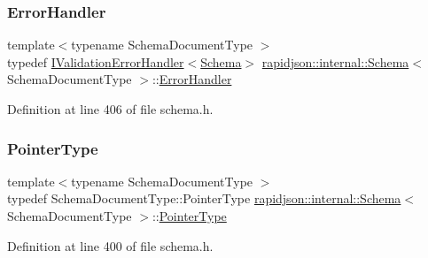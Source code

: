 \mbox{\label{classrapidjson_1_1internal_1_1_schema_ab10ebd341d1058236e9aac64cf2cb1eb}} 
\subsubsection{\texorpdfstring{ErrorHandler}{ErrorHandler}}
{\footnotesize\ttfamily template$<$typename Schema\+Document\+Type $>$ \\
typedef \mbox{\hyperlink{classrapidjson_1_1internal_1_1_i_validation_error_handler}{I\+Validation\+Error\+Handler}}$<$\mbox{\hyperlink{classrapidjson_1_1internal_1_1_schema}{Schema}}$>$ \mbox{\hyperlink{classrapidjson_1_1internal_1_1_schema}{rapidjson\+::internal\+::\+Schema}}$<$ Schema\+Document\+Type $>$\+::\mbox{\hyperlink{classrapidjson_1_1internal_1_1_schema_ab10ebd341d1058236e9aac64cf2cb1eb}{Error\+Handler}}}



Definition at line 406 of file schema.\+h.

\mbox{\label{classrapidjson_1_1internal_1_1_schema_aa54c71c41aa8a9091565d12ffe27627c}} 
\subsubsection{\texorpdfstring{PointerType}{PointerType}}
{\footnotesize\ttfamily template$<$typename Schema\+Document\+Type $>$ \\
typedef Schema\+Document\+Type\+::\+Pointer\+Type \mbox{\hyperlink{classrapidjson_1_1internal_1_1_schema}{rapidjson\+::internal\+::\+Schema}}$<$ Schema\+Document\+Type $>$\+::\mbox{\hyperlink{classrapidjson_1_1internal_1_1_schema_aa54c71c41aa8a9091565d12ffe27627c}{Pointer\+Type}}}



Definition at line 400 of file schema.\+h.

